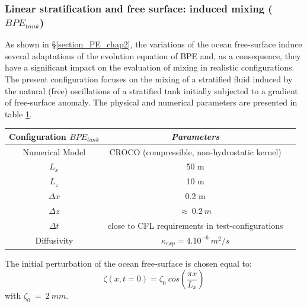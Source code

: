 \subsubsection{Linear stratification and free surface: induced mixing ($BPE_{tank}$)}

As shown in \S \ref{section_PE_chap2}, the variations of the ocean free-surface induce several adaptations of the evolution equation of BPE and, as a consequence, they have a significant impact on the evaluation of mixing in realistic configurations. The present configuration focuses on the mixing of a stratified fluid induced by the natural (free) oscillations of a stratified tank initially subjected to a gradient of free-surface anomaly. The physical and numerical parameters are presented in table \ref{tab_BPE_TANK}.

\begin{table}[h]
        \centering
        \begin{tabular}{|c|c|c|}
                \hline
                Configuration $BPE_{tank}$ & \textit{Parameters}\\
                \hline 
                Numerical Model & CROCO (compressible, non-hydrostatic kernel)\\
                $L_x$ & 50 m\\
                $L_z$ & 10 m\\
                $\Delta x$ & 0.2 m\\
                $\Delta z$ & $\approx\ 0.2\ m$\\
                $\Delta t$ & close to CFL requirements in test-configurations\\
                Diffusivity & $\kappa_{exp} = 4.10^{-6} \ m^2/s$\\
                \hline
        \end{tabular}
        \label{tab_BPE_TANK}
\end{table}
The initial perturbation of the ocean free-surface is chosen equal to:
\begin{equation}
\displaystyle
\zeta(x,t=0)=\zeta_0\ cos\left(\frac{\pi x}{L_x}\right)
\end{equation}
with $\zeta_0\ =\ 2\ mm$.


